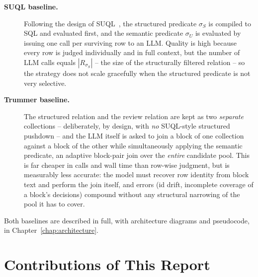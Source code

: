 \begin{description}
\item[\textbf{SUQL baseline.}] Following the design of SUQL~\cite{suql},
  the structured predicate $\sigma_S$ is compiled to SQL and evaluated
  first, and the semantic predicate $\sigma_U$ is evaluated by issuing
  one \answerfn{} call per surviving row to an LLM. Quality is high
  because every row is judged individually and in full context, but the
  number of LLM calls equals $|R_{\sigma_S}|$ -- the size of the
  structurally filtered relation -- so the strategy does not scale
  gracefully when the structured predicate is not very selective.
\item[\textbf{Trummer baseline.}] The structured relation and the review
  relation are kept as two \emph{separate} collections -- deliberately,
  by design, with \emph{no} SUQL-style structured pushdown -- and the
  LLM itself is asked to join a block of one collection against a block
  of the other while simultaneously applying the semantic predicate, an
  adaptive block-pair join over the \emph{entire} candidate pool. This
  is far cheaper in calls and wall time than row-wise judgment, but is
  measurably less accurate: the model must recover row identity from
  block text and perform the join itself, and errors (id drift,
  incomplete coverage of a block's decisions) compound without any
  structural narrowing of the pool it has to cover.
\end{description}

Both baselines are described in full, with architecture diagrams and
pseudocode, in Chapter~\ref{chap:architecture}.

\section{Contributions of This Report}

